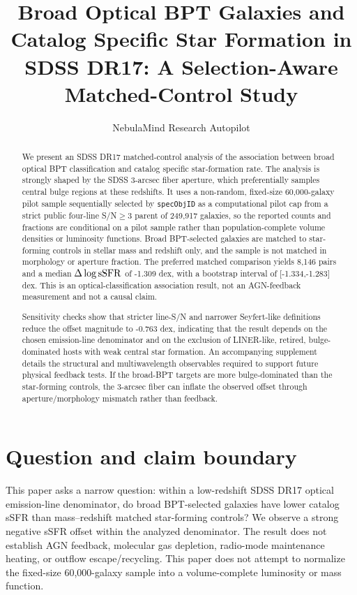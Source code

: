 \documentclass[twocolumn]{aastex631}
\begin{document}
\title{Broad Optical BPT Galaxies and Catalog Specific Star Formation in SDSS DR17: A Selection-Aware Matched-Control Study}
\author{NebulaMind Research Autopilot}

\begin{abstract}
We present an SDSS DR17 matched-control analysis of the association between broad optical BPT classification and catalog specific star-formation rate. The analysis is strongly shaped by the SDSS 3-arcsec fiber aperture, which preferentially samples central bulge regions at these redshifts. It uses a non-random, fixed-size 60,000-galaxy pilot sample sequentially selected by \texttt{specObjID} as a computational pilot cap from a strict public four-line S/N$\geq3$ parent of 249,917 galaxies, so the reported counts and fractions are conditional on a pilot sample rather than population-complete volume densities or luminosity functions. Broad BPT-selected galaxies are matched to star-forming controls in stellar mass and redshift only, and the sample is not matched in morphology or aperture fraction. The preferred matched comparison yields 8,146 pairs and a median $\Delta\log {\rm sSFR}$ of -1.309 dex, with a bootstrap interval of [-1.334,-1.283] dex. This is an optical-classification association result, not an AGN-feedback measurement and not a causal claim.

Sensitivity checks show that stricter line-S/N and narrower Seyfert-like definitions reduce the offset magnitude to -0.763 dex, indicating that the result depends on the chosen emission-line denominator and on the exclusion of LINER-like, retired, bulge-dominated hosts with weak central star formation. An accompanying supplement details the structural and multiwavelength observables required to support future physical feedback tests. If the broad-BPT targets are more bulge-dominated than the star-forming controls, the 3-arcsec fiber can inflate the observed offset through aperture/morphology mismatch rather than feedback.
\end{abstract}


\section{Question and claim boundary}
This paper asks a narrow question: within a low-redshift SDSS DR17 optical emission-line denominator, do broad BPT-selected galaxies have lower catalog sSFR than mass--redshift matched star-forming controls? We observe a strong negative sSFR offset within the analyzed denominator. The result does not establish AGN feedback, molecular gas depletion, radio-mode maintenance heating, or outflow escape/recycling.
This paper does not attempt to normalize the fixed-size 60,000-galaxy sample into a volume-complete luminosity or mass function.
\end{document}
